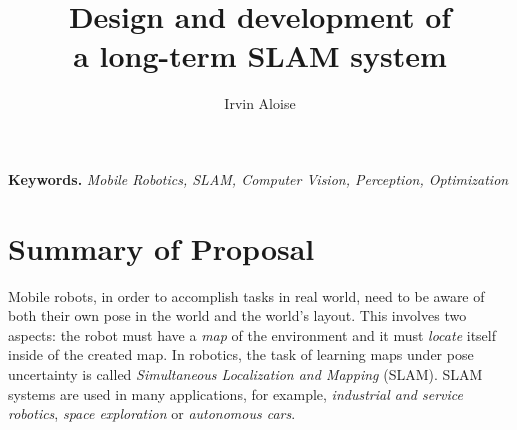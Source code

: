 \documentclass[10pt,a4paper, notitlepage]{report}
\title{Design and development of \\ a long-term SLAM system}
\author{Irvin Aloise}
\begin{document}
\maketitle


\textbf{Keywords.} \textit{Mobile Robotics, SLAM, Computer Vision, Perception, Optimization}


\section*{Summary of Proposal}
Mobile robots, in order to accomplish tasks in real world, need to be aware of both their own pose in the world and the world's layout. This involves two aspects: the robot must have a \textit{map} of the environment and it must \textit{locate} itself inside of the created map. In robotics, the task of learning maps under pose uncertainty is called \textit{Simultaneous Localization and Mapping} (SLAM). SLAM systems are used in many applications, for example, \textit{industrial and service robotics}, \textit{space exploration} or \textit{autonomous cars}. 
\end{document}
